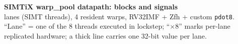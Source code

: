 \newpage
\thispagestyle{empty}
\setlength{\tabcolsep}{3pt}
\renewcommand{\arraystretch}{1.04}
\newcommand{\grp}[1]{\multicolumn{2}{@{}l@{}}{\rule{0pt}{2.6ex}\textbf{\color{black!75}#1}}\\[1pt]\hline}
\newcommand{\nm}[1]{\textbf{#1}}

{\fontsize{13}{15}\selectfont\textbf{SIMTiX warp\_pool datapath: blocks and signals}}\\[1.5mm]
{\fontsize{8.5}{10} lanes (SIMT threads), 4 resident warps, RV32IMF + Zfh + custom \texttt{pdot8}.
``Lane'' = one of the 8 threads executed in lockstep; ``$\times$8'' marks per-lane replicated hardware;
a thick line carries one 32-bit value per lane.}\\[2mm]


